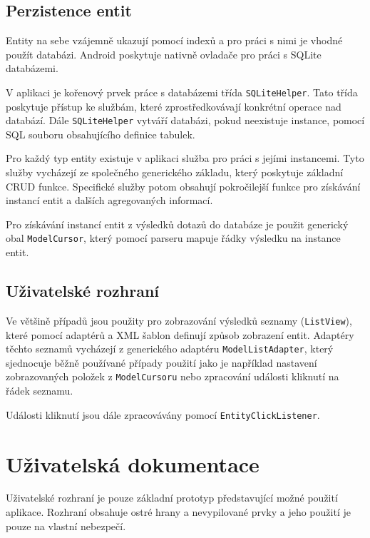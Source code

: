 \documentclass[12pt,a4paper]{article}
\let\oldsection\section
\renewcommand\section{\clearpage\oldsection}
\begin{document}
\subsection{Perzistence entit}
Entity na sebe vzájemně ukazují pomocí indexů a pro práci s nimi je vhodné použít databázi. Android poskytuje nativně ovladače pro práci s SQLite databázemi.

V aplikaci je kořenový prvek práce s databázemi třída \texttt{SQLiteHelper}. Tato třída poskytuje přístup ke službám, které zprostředkovávají konkrétní operace nad databází. Dále \texttt{SQLiteHelper} vytváří databázi, pokud neexistuje instance, pomocí SQL souboru obsahujícího definice tabulek.

Pro každý typ entity existuje v aplikaci služba pro práci s jejími instancemi. Tyto služby vycházejí ze společného generického základu, který poskytuje základní CRUD funkce.
Specifické služby potom obsahují pokročilejší funkce pro získávání instancí entit a dalších agregovaných informací.

Pro získávání instancí entit z výsledků dotazů do databáze je použit generický obal \texttt{ModelCursor}, který pomocí parseru mapuje řádky výsledku na instance entit.

\subsection{Uživatelské rozhraní}
Ve většině případů jsou použity pro zobrazování výsledků seznamy (\texttt{ListView}), které pomocí adaptérů a XML šablon definují způsob zobrazení entit.
Adaptéry těchto seznamů vycházejí z generického adaptéru \texttt{ModelListAdapter}, který sjednocuje běžně používané případy použití jako je například nastavení zobrazovaných položek z \texttt{ModelCursoru} nebo zpracování události kliknutí na řádek seznamu.

Události kliknutí jsou dále zpracovávány pomocí \texttt{EntityClickListener}.


\section{Uživatelská dokumentace}
Uživatelské rozhraní je pouze základní prototyp představující možné použití aplikace. Rozhraní obsahuje ostré hrany a nevypilované prvky a jeho použití je pouze na vlastní nebezpečí.
\end{document}
